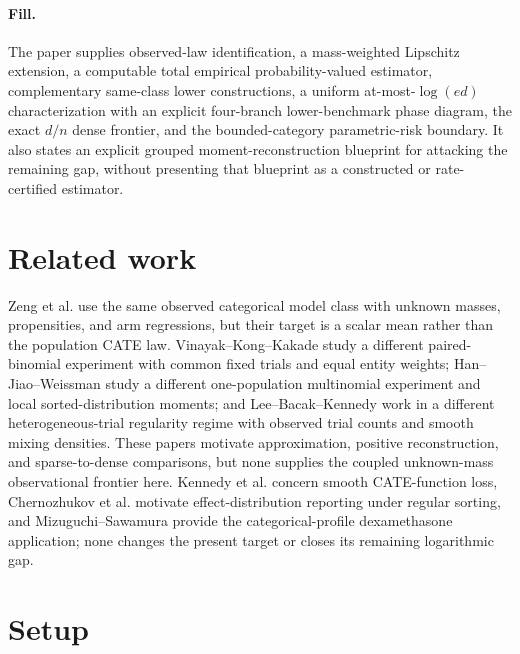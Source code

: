 \documentclass{article}
\begin{document}
\paragraph{Fill.} The paper supplies observed-law identification, a mass-weighted Lipschitz extension, a computable total empirical probability-valued estimator, complementary same-class lower constructions, a uniform at-most-\(\log(ed)\) characterization with an explicit four-branch lower-benchmark phase diagram, the exact \(d/n\) dense frontier, and the bounded-category parametric-risk boundary.  It also states an explicit grouped moment-reconstruction blueprint for attacking the remaining gap, without presenting that blueprint as a constructed or rate-certified estimator.

\section{Related work}

Zeng et al. use the same observed categorical model class with unknown masses, propensities, and arm regressions, but their target is a scalar mean rather than the population CATE law.  Vinayak--Kong--Kakade study a different paired-binomial experiment with common fixed trials and equal entity weights; Han--Jiao--Weissman study a different one-population multinomial experiment and local sorted-distribution moments; and Lee--Bacak--Kennedy work in a different heterogeneous-trial regularity regime with observed trial counts and smooth mixing densities.  These papers motivate approximation, positive reconstruction, and sparse-to-dense comparisons, but none supplies the coupled unknown-mass observational frontier here.  Kennedy et al. concern smooth CATE-function loss, Chernozhukov et al. motivate effect-distribution reporting under regular sorting, and Mizuguchi--Sawamura provide the categorical-profile dexamethasone application; none changes the present target or closes its remaining logarithmic gap.

\section{Setup}
\end{document}

